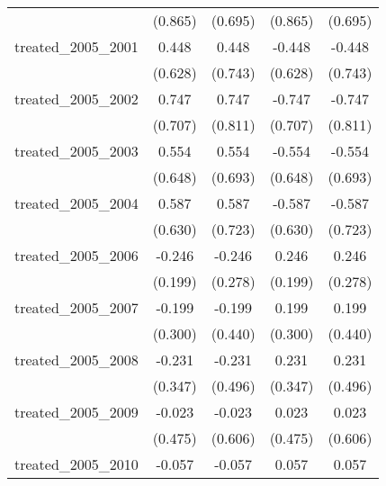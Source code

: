 {\begin{tabular}{l*{4}{c}}
            &     (0.865)         &     (0.695)         &     (0.865)         &     (0.695)         \\
[1em]
treated\_2005\_2001&       0.448         &       0.448         &      -0.448         &      -0.448         \\
            &     (0.628)         &     (0.743)         &     (0.628)         &     (0.743)         \\
[1em]
treated\_2005\_2002&       0.747         &       0.747         &      -0.747         &      -0.747         \\
            &     (0.707)         &     (0.811)         &     (0.707)         &     (0.811)         \\
[1em]
treated\_2005\_2003&       0.554         &       0.554         &      -0.554         &      -0.554         \\
            &     (0.648)         &     (0.693)         &     (0.648)         &     (0.693)         \\
[1em]
treated\_2005\_2004&       0.587         &       0.587         &      -0.587         &      -0.587         \\
            &     (0.630)         &     (0.723)         &     (0.630)         &     (0.723)         \\
[1em]
treated\_2005\_2006&      -0.246         &      -0.246         &       0.246         &       0.246         \\
            &     (0.199)         &     (0.278)         &     (0.199)         &     (0.278)         \\
[1em]
treated\_2005\_2007&      -0.199         &      -0.199         &       0.199         &       0.199         \\
            &     (0.300)         &     (0.440)         &     (0.300)         &     (0.440)         \\
[1em]
treated\_2005\_2008&      -0.231         &      -0.231         &       0.231         &       0.231         \\
            &     (0.347)         &     (0.496)         &     (0.347)         &     (0.496)         \\
[1em]
treated\_2005\_2009&      -0.023         &      -0.023         &       0.023         &       0.023         \\
            &     (0.475)         &     (0.606)         &     (0.475)         &     (0.606)         \\
[1em]
treated\_2005\_2010&      -0.057         &      -0.057         &       0.057         &       0.057         \\

\end{tabular}}

